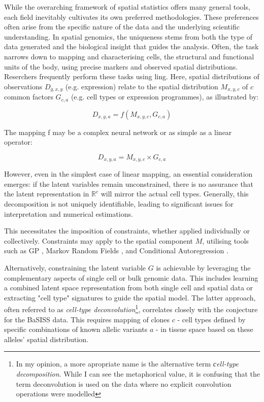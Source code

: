 While the overarching framework of spatial statistics offers many general tools, each field inevitably cultivates its own preferred methodologies. These preferences often arise from the specific nature of the data and the underlying scientific understanding. In spatial genomics, the uniqueness stems from both the type of data generated and the biological insight that guides the analysis. Often, the task narrows down to mapping and characterising cells, the structural and functional units of the body, using precise markers and observed spatial distributions. Reserchers frequently perform these tasks using ling. Here, spatial distributions of observations $D_{g,x,y}$ (e.g. expression) relate to the spatial distribution $M_{x,y,c}$ of $c$ common factors $G_{c,a}$ (e.g. cell types or expression programmes), as illustrated by:

\begin{equation}
    D_{x,y,a} = f(M_{x,y,c}, G_{c,a})
\end{equation}

The mapping f may be a complex neural network \parencite{Dong2022-mu, Ma2022-pd} or as simple as a linear operator:

\begin{equation}
    D_{x,y,a} = M_{x,y,c} \times G_{c,a}
\end{equation}

However, even in the simplest case of linear mapping, an essential consideration emerges: if the latent variables remain unconstrained, there is no assurance that the latent representation in $\mathbb{R} ^c$ will mirror the actual cell types. Generally, this decomposition is not uniquely identifiable, leading to significant issues for interpretation and numerical estimations.

This necessitates the imposition of constraints, whether applied individually or collectively. Constraints may apply to the spatial component $M$, utilising tools such as \acf{GP} \parencite{Townes2023-uj}, Markov Random Fields \parencite{Petukhov2022-qr}, and Conditional Autoregression \parencite{Ma2022-pd, Ni2022-tu}.

Alternatively, constraining the latent variable $G$ is achievable by leveraging the complementary aspects of single cell or bulk genomic data. This includes learning a combined latent space representation from both single cell and spatial data or extracting "cell type" signatures to guide the spatial model. The latter approach, often referred to as \emph{cell-type deconvolution}\footnote{In my opinion, a more apropriate name is the alternative term \emph{сell-type decomposition}. While I can see the metaphorical value, it is confusing that the term deconvolution is used on the data where no explicit convolution operations were modelled}, correlates closely with the conjecture for the \ac{BaSISS} data. This requires mapping of clones $c$ - cell types defined by specific combinations of known allelic variants $a$ - in tissue space based on these alleles' spatial distribution.

